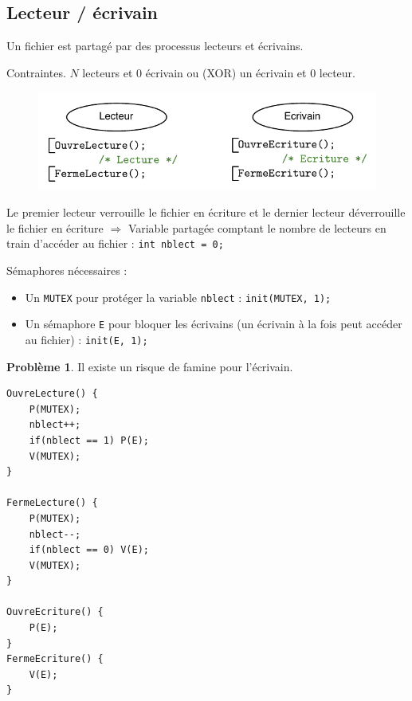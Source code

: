 \documentclass[11pt,english,french]{scrreprt}
\theoremstyle{remark}
\theoremstyle{definition}
\newtheorem*{pb*}{Problème}
\begin{document}
\subsection{Lecteur / écrivain}
Un fichier est partagé par des processus lecteurs et écrivains.

Contraintes. $N$ lecteurs et 0 écrivain ou (XOR) un écrivain et 0 lecteur.

\begin{figure}[h!]
	\center
	\vspace{-10pt}
	\includegraphics[scale=.85]{img/lec-ecr}
	\vspace{-15pt}
\end{figure}

	Le premier lecteur verrouille le fichier en écriture et le dernier lecteur déverrouille le fichier en écriture $\Rightarrow$ Variable partagée comptant le nombre de lecteurs en train d'accéder au fichier : \lstinline!int nblect = 0;!

Sémaphores nécessaires : \begin{itemize}
	\item Un \lstinline!MUTEX! pour protéger la variable \lstinline!nblect! : \lstinline!init(MUTEX, 1);!
	\item Un sémaphore \lstinline!E! pour bloquer les écrivains (un écrivain à la fois peut accéder au fichier) : \lstinline!init(E, 1);! 
\end{itemize}

\begin{pb*}
	Il existe un risque de famine pour l'écrivain.
\end{pb*}
\vspace{-10pt}
\begin{lstlisting}[multicols=3,tabsize=4]
OuvreLecture() {
	P(MUTEX);
	nblect++;
	if(nblect == 1) P(E);
	V(MUTEX);
}

FermeLecture() {
	P(MUTEX);
	nblect--;
	if(nblect == 0) V(E);
	V(MUTEX);
}

OuvreEcriture() {
	P(E);
}
FermeEcriture() {
	V(E);
}	
\end{lstlisting}
\vspace{-10pt}
\end{document}
